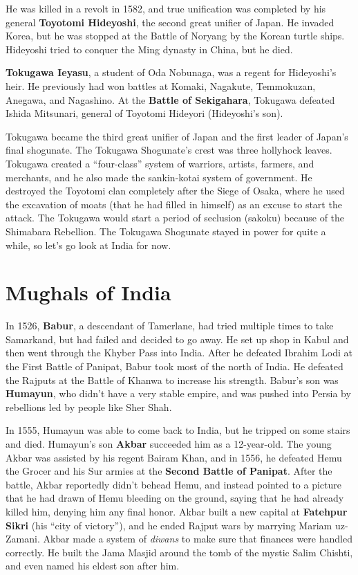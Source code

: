 He was killed in a revolt in 1582,
and true unification was completed by his general \textbf{Toyotomi Hideyoshi},
the second great unifier of Japan.
He invaded Korea, but he was stopped at the Battle of Noryang by the Korean turtle ships.
Hideyoshi tried to conquer the Ming dynasty in China, but he died.

\textbf{Tokugawa Ieyasu}, a student of Oda Nobunaga, was a regent for Hideyoshi's heir.
He previously had won battles at Komaki, Nagakute, Temmokuzan, Anegawa, and Nagashino.
At the \textbf{Battle of Sekigahara}, Tokugawa defeated Ishida Mitsunari,
general of Toyotomi Hideyori (Hideyoshi's son).

Tokugawa became the third great unifier of Japan and the first leader of Japan's final shogunate.
The Tokugawa Shogunate's crest was three hollyhock leaves.
Tokugawa created a ``four-class'' system of warriors, artists, farmers, and merchants,
and he also made the sankin-kotai system of government.
He destroyed the Toyotomi clan completely after the Siege of Osaka,
where he used the excavation of moats
(that he had filled in himself)
as an excuse to start the attack.
The Tokugawa would start a period of seclusion (sakoku) because of the Shimabara Rebellion.
The Tokugawa Shogunate stayed in power for quite a while, so let's go look at India for now.

\section{Mughals of India}

In 1526, \textbf{Babur}, a descendant of Tamerlane,
had tried multiple times to take Samarkand, but had failed and decided to go away.
He set up shop in Kabul and then went through the Khyber Pass into India.
After he defeated Ibrahim Lodi at the First Battle of Panipat,
Babur took most of the north of India.
He defeated the Rajputs at the Battle of Khanwa to increase his strength.
Babur's son was \textbf{Humayun}, who didn't have a very stable empire,
and was pushed into Persia by rebellions led by people like Sher Shah.

In 1555, Humayun was able to come back to India, but he tripped on some stairs and died.
Humayun's son \textbf{Akbar} succeeded him as a 12-year-old.
The young Akbar was assisted by his regent Bairam Khan,
and in 1556,
he defeated Hemu the Grocer and his Sur armies at the \textbf{Second Battle of Panipat}.
After the battle, Akbar reportedly didn't behead Hemu,
and instead pointed to a picture that he had drawn of Hemu bleeding on the ground,
saying that he had already killed him, denying him any final honor.
Akbar built a new capital at \textbf{Fatehpur Sikri} (his ``city of victory''),
and he ended Rajput wars by marrying Mariam uz-Zamani.
Akbar made a system of \textit{diwans} to make sure that finances were handled correctly.
He built the Jama Masjid around the tomb of the mystic Salim Chishti,
and even named his eldest son after him.

